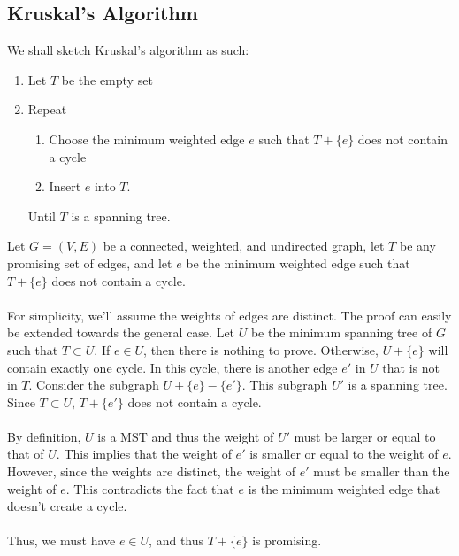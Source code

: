 \documentclass[a4paper]{article}
\begin{document}
\subsection{Kruskal's Algorithm}
We shall sketch Kruskal's algorithm as such:
\begin{enumerate}
	\item Let $T$ be the empty set
	\item Repeat
	\begin{enumerate}
		\item Choose the minimum weighted edge $e$ such that $T + \{e\}$ does not contain a cycle
		\item Insert $e$ into $T$.
	\end{enumerate}
	Until $T$ is a spanning tree.
\end{enumerate}
Let $G=(V,E)$ be a connected, weighted, and undirected graph, let $T$ be any promising set of edges, and let $e$ be the minimum weighted edge such that $T + \{e\}$ does not contain a cycle.\\\\
For simplicity, we'll assume the weights of edges are distinct. The proof can easily be extended towards the general case. Let $U$ be the minimum spanning tree of $G$ such that $T \subset U$. If $e \in U$, then there is nothing to prove. Otherwise, $U + \{e\}$ will contain exactly one cycle. In this cycle, there is another edge $e'$ in $U$ that is not in $T$. Consider the subgraph $U + \{e\} - \{e'\}$. This subgraph $U'$ is a spanning tree. Since $T\subset U$, $T + \{e'\}$ does not contain a cycle.\\\\
By definition, $U$ is a MST and thus the weight of $U'$ must be larger or equal to that of $U$. This implies that the weight of $e'$ is smaller or equal to the weight of $e$. However, since the weights are distinct, the weight of $e'$ must be smaller than the weight of $e$. This contradicts the fact that $e$ is the minimum weighted edge that doesn't create a cycle.\\\\
Thus, we must have $e\in U$, and thus $T + \{e\}$ is promising.
\end{document}
